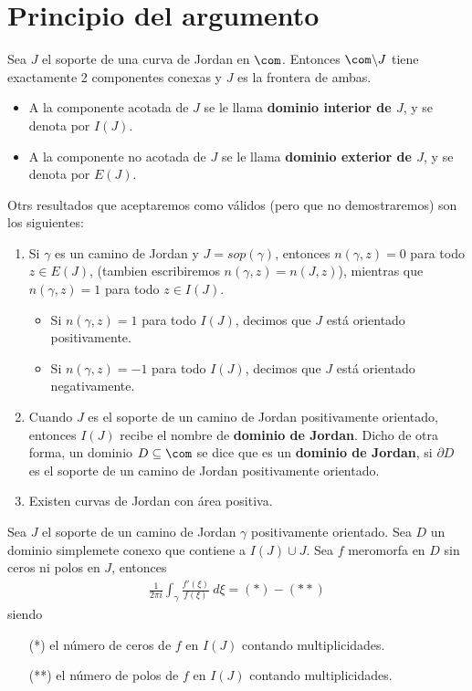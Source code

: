 \section{Principio del argumento}

\begin{teo}
Sea $J$ el soporte de una curva de Jordan en $\com$. Entonces $\com \backslash J$ tiene exactamente 2 componentes conexas y $J$ es la frontera de ambas.
\begin{itemize}
    \item A la componente acotada de $J$ se le llama \textbf{dominio interior de $J$}, y se denota por $I(J)$.
    \item A la componente no acotada de $J$ se le llama \textbf{dominio exterior de $J$}, y se denota por $E(J)$.
\end{itemize}
\end{teo}

Otrs resultados que aceptaremos como válidos (pero que no demostraremos) son los siguientes:
\begin{enumerate}
    \item Si $\gamma$ es un camino de Jordan y $J = sop(\gamma)$, entonces $n(\gamma,z) = 0$ para todo $z \in E(J)$, (tambien escribiremos $n(\gamma,z) = n(J,z)$), mientras que $n(\gamma,z) = 1$ para todo $z \in I(J)$.
    \begin{itemize}
        \item Si $n(\gamma,z) = 1$ para todo $I(J)$, decimos que $J$ está orientado positivamente.
        \item Si $n(\gamma,z) = -1$ para todo $I(J)$, decimos que $J$ está orientado negativamente.
    \end{itemize}
    \item Cuando $J$ es el soporte de un camino de Jordan positivamente orientado, entonces $I(J)$ recibe el nombre de \textbf{dominio de Jordan}. Dicho de otra forma, un dominio $D \subseteq \com$ se dice que es un \textbf{dominio de Jordan}, si $\partial D$ es el soporte de un camino de Jordan positivamente orientado.
    \item Existen curvas de Jordan con área positiva.
\end{enumerate}

\begin{teo}
Sea $J$ el soporte de un camino de Jordan $\gamma$ positivamente orientado. Sea $D$ un dominio simplemete conexo que contiene a $I(J) \cup J$. Sea $f$ meromorfa en $D$ sin ceros ni polos en $J$, entonces
\begin{align*}
    \frac{1}{2\pi i} \int_{\gamma} \frac{f'(\xi)}{f(\xi)} \ d\xi = (*) - (**)
\end{align*}
siendo
\begin{enumerate}
    \item[(*)] el número de ceros de $f$ en $I(J)$ contando multiplicidades.
    \item[(**)] el número de polos de $f$ en $I(J)$ contando multiplicidades.
\end{enumerate}
\end{teo}

